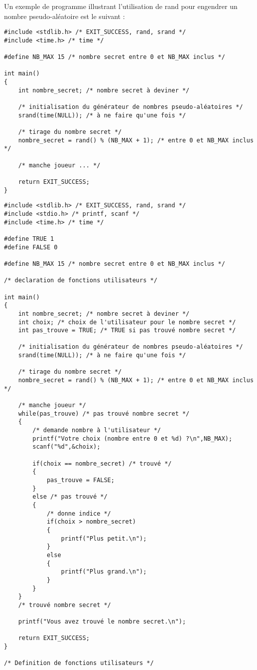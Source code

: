 Un exemple de programme illustrant l'utilisation de rand pour
engendrer un nombre pseudo-aléatoire est le suivant :
\begin{small}
\begin{verbatim}
#include <stdlib.h> /* EXIT_SUCCESS, rand, srand */
#include <time.h> /* time */

#define NB_MAX 15 /* nombre secret entre 0 et NB_MAX inclus */

int main()
{
    int nombre_secret; /* nombre secret à deviner */

    /* initialisation du générateur de nombres pseudo-aléatoires */
    srand(time(NULL)); /* à ne faire qu'une fois */

    /* tirage du nombre secret */
    nombre_secret = rand() % (NB_MAX + 1); /* entre 0 et NB_MAX inclus */

    /* manche joueur ... */

    return EXIT_SUCCESS;
}
\end{verbatim}
\end{small}

\begin{correction}
\begin{verbatim}
#include <stdlib.h> /* EXIT_SUCCESS, rand, srand */
#include <stdio.h> /* printf, scanf */
#include <time.h> /* time */

#define TRUE 1
#define FALSE 0

#define NB_MAX 15 /* nombre secret entre 0 et NB_MAX inclus */

/* declaration de fonctions utilisateurs */

int main()
{
    int nombre_secret; /* nombre secret à deviner */
    int choix; /* choix de l'utilisateur pour le nombre secret */
    int pas_trouve = TRUE; /* TRUE si pas trouvé nombre secret */

    /* initialisation du générateur de nombres pseudo-aléatoires */
    srand(time(NULL)); /* à ne faire qu'une fois */

    /* tirage du nombre secret */
    nombre_secret = rand() % (NB_MAX + 1); /* entre 0 et NB_MAX inclus */

    /* manche joueur */
    while(pas_trouve) /* pas trouvé nombre secret */
    {
        /* demande nombre à l'utilisateur */
        printf("Votre choix (nombre entre 0 et %d) ?\n",NB_MAX);
        scanf("%d",&choix);
        
        if(choix == nombre_secret) /* trouvé */
        {
            pas_trouve = FALSE;
        }
        else /* pas trouvé */
        {
            /* donne indice */
            if(choix > nombre_secret)
            {
                printf("Plus petit.\n");
            }
            else
            {
                printf("Plus grand.\n");
            }
        }
    }
    /* trouvé nombre secret */

    printf("Vous avez trouvé le nombre secret.\n");

    return EXIT_SUCCESS;
}

/* Definition de fonctions utilisateurs */
\end{verbatim}
\end{correction}

